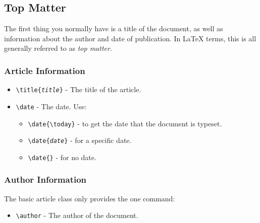 \documentclass{article}
\begin{document}
    \subsection{Top Matter}
    The first thing you normally have is a title of the document, as well as
    information about the author and date of publication.  In \LaTeX{} terms,
    this is all generally referred to as \emph{top matter}.

    \subsubsection{Article Information}
    \begin{itemize}
        \item \texttt{\textbackslash title\{\emph{title}\}} - The title of the article.
        \item \texttt{\textbackslash date} - The date. Use:
        \begin{itemize}
            \item \texttt{\textbackslash date\{\textbackslash today\}} - to get the
            date that the document is typeset.
            \item \texttt{\textbackslash date\{\emph{date}\}} - for a  %
            specific date.
            \item \texttt{\textbackslash date\{\}} - for no date.
        \end{itemize}
    \end{itemize}

    \subsubsection{Author Information}
    The basic article class only provides the one command:
    \begin{itemize}
        \item \texttt{\textbackslash author} - The author of the document.
    \end{itemize}
\end{document}
